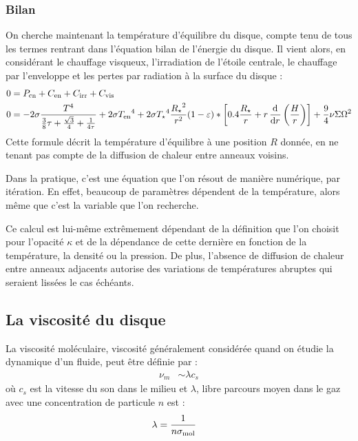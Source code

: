 \subsubsection{Bilan}
On cherche maintenant la température d'équilibre du disque, compte tenu de tous les termes rentrant dans l'équation bilan de l'énergie du disque. Il vient alors, en considérant le chauffage visqueux, l'irradiation de l'étoile centrale, le chauffage par l'enveloppe et les pertes par radiation à la surface du disque : 
\begin{align}
0 &= P_\text{cn} + C_\text{en} + C_\text{irr} + C_\text{vis}\nonumber\\
0 &= - 2\sigma \frac{T^4}{\frac{3}{8}\tau + \frac{\sqrt{3}}{4} + \inv{4\tau}} + 2 \sigma {T_\text{en}}^4 + 2 \sigma {T_\star}^4 \frac{{R_\star}^2}{r^2} (1-\varepsilon) * \left[0.4 \frac{R_\star}{r} + r \dod{}{r}\left(\frac{H}{r}\right)\right] + \frac{9}{4} \nu\Sigma\Omega^2\label{eq:equation_energie}
\end{align}
Cette formule décrit la température d'équilibre à une position $R$ donnée, en ne tenant pas compte de la diffusion de chaleur entre anneaux voisins.

Dans la pratique, c'est une équation que l'on résout de manière numérique, par itération. En effet, beaucoup de paramètres
dépendent de la température, alors même que c'est la variable que l'on recherche. 

Ce calcul est lui-même extrêmement dépendant de la définition que l'on choisit pour l'opacité $\kappa$ et de la dépendance de
cette dernière en fonction de la température, la densité ou la pression. De plus, l'absence de diffusion de chaleur entre anneaux adjacents autorise des variations de températures abruptes qui seraient lissées le cas échéants.

\subsection{La viscosité du disque}\label{sec:viscosite}%
La viscosité moléculaire, viscosité généralement considérée quand on étudie la dynamique d'un fluide, peut être définie par : 
\begin{align}
\nu_m &\sim \lambda c_s
\end{align}
où $c_s$ est la vitesse du son dans le milieu et $\lambda$, libre parcours moyen dans le gaz avec une concentration de particule $n$ est :
\begin{align}
\lambda &= \frac{1}{n\sigma_\text{mol}}
\end{align}


